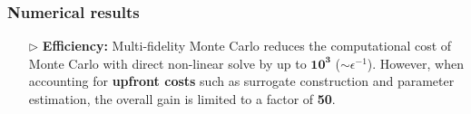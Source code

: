 \documentclass{beamer}
\begin{document}
\begin{frame}[t]
    \frametitle{Numerical results}
\begin{itemize}[leftmargin=5pt] 
%

\item[$\triangleright$] \textcolor{myblue3}{\bf Efficiency:} {\footnotesize 
 Multi-fidelity Monte Carlo reduces the computational cost of Monte Carlo with direct non-linear solve by up to  $\boldsymbol{10^3}$ ($\sim \epsilon^{-1}$). However,  when accounting for {\bf upfront costs} such as surrogate construction and parameter estimation, the overall gain is limited to a factor of {\bf 50}.}
 \vspace{3mm}
\begin{figure}[ht!]\centering
{}
\label{fig:Experiment_result_plot}
\end{figure}

\end{itemize}
\end{frame}
\end{document}
